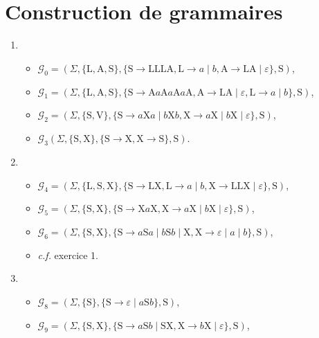 \section{Construction de grammaires}

\begin{enumerate}
	\item
		\begin{itemize}
			\item $\mathcal{G}_0 = (\Sigma, \{\mathrm{L}, \mathrm{A}, \mathrm{S}\}, \{\mathrm{S} \to \mathrm{LLLA}, \mathrm{L} \to a  \mid b, \mathrm{A} \to \mathrm{LA}  \mid \varepsilon\}, \mathrm{S})$,
			\item $\mathcal{G}_1 = (\Sigma, \{\mathrm{L}, \mathrm{A}, \mathrm{S}\}, \{\mathrm{S} \to \mathrm{A}a \mathrm{A}a \mathrm{A} a \mathrm{A}, \mathrm{A} \to \mathrm{L}\mathrm{A}  \mid \varepsilon, \mathrm{L} \to a  \mid b\}, \mathrm{S})$,
			\item $\mathcal{G}_2 = (\Sigma, \{\mathrm{S},\mathrm{V}\}, \{\mathrm{S} \to a \mathrm{X} a  \mid b \mathrm{X} b, \mathrm{X} \to a \mathrm{X}  \mid b \mathrm{X}  \mid \varepsilon\}, \mathrm{S})$,
			\item $\mathcal{G}_3(\Sigma, \{\mathrm{S}, \mathrm{X}\}, \{\mathrm{S} \to \mathrm{X}, \mathrm{X}\to \mathrm{S}\}, \mathrm{S})$.
		\end{itemize}
	\item
		\begin{itemize}
			\item $\mathcal{G}_4 = (\Sigma, \{\mathrm{L},\mathrm{S}, \mathrm{X}\}, \{\mathrm{S} \to \mathrm{L} \mathrm{X}, \mathrm{L} \to a \mid b, \mathrm{X} \to \mathrm{LLX}  \mid \varepsilon\}, \mathrm{S})$,
			\item $\mathcal{G}_5 = (\Sigma, \{\mathrm{S}, \mathrm{X}\}, \{ \mathrm{S} \to \mathrm{X} a \mathrm{X}, \mathrm{X} \to a \mathrm{X}  \mid b \mathrm{X}  \mid \varepsilon\}, \mathrm{S})$,
			\item $\mathcal{G}_6 = (\Sigma, \{\mathrm{S}, \mathrm{X}\}, \{\mathrm{S} \to a \mathrm{S} a  \mid b \mathrm{S} b  \mid \mathrm{X}, \mathrm{X} \to \varepsilon  \mid a  \mid b\}, \mathrm{S})$,
			\item \textit{c.f.} exercice 1.
		\end{itemize}
	\item
		\begin{itemize}
			\item $\mathcal{G}_8 = (\Sigma, \{\mathrm{S}\}, \{\mathrm{S} \to \varepsilon  \mid a \mathrm{S} b\}, \mathrm{S})$,
			\item $\mathcal{G}_9 = (\Sigma, \{ \mathrm{S}, \mathrm{X} \}, \{\mathrm{S} \to a \mathrm{S} b  \mid \mathrm{S} \mathrm{X}, \mathrm{X} \to b \mathrm{X}  \mid \varepsilon\}, \mathrm{S})$,

\end{itemize}
\end{enumerate}
